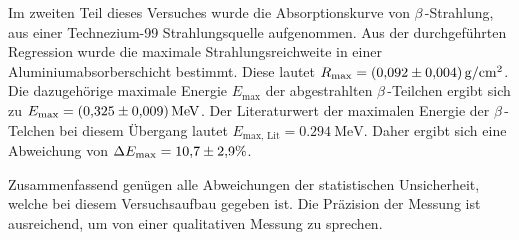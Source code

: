 Im zweiten Teil dieses Versuches wurde die Absorptionskurve von $\beta$\,-Strahlung, aus einer Technezium-99 Strahlungsquelle aufgenommen. Aus der durchgeführten 
Regression wurde die maximale Strahlungsreichweite in einer Aluminiumabsorberschicht bestimmt. Diese lautet $R_\text{max} = \qty{0.092 +- 0.004}{\gram\per\centi\metre\squared}$. 
Die dazugehörige maximale Energie $E_\text{max}$ der abgestrahlten $\beta$\,-Teilchen ergibt sich zu $E_\text{max} = \qty{0.325 +- 0.009}{\mega\electronvolt}$. Der Literaturwert
der maximalen Energie der $\beta$\,-Telchen bei diesem Übergang lautet $E_{\text{max, Lit}} = \qty{0.294}{\mega\electronvolt}$. Daher ergibt sich eine Abweichung von
$\Delta E_\text{max} = \num{10.7 +- 2.9}\%$. 

Zusammenfassend genügen alle Abweichungen der statistischen Unsicherheit, welche bei diesem Versuchsaufbau gegeben ist. Die Präzision der Messung ist ausreichend, um 
von einer qualitativen Messung zu sprechen.